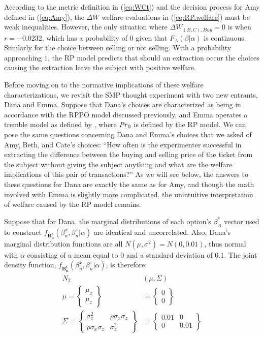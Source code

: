 According to the metric definition in (\ref{eq:WCt}) and the decision process for Amy defined in (\ref{eq:Amy}), the $\Delta W$ welfare evaluations in (\ref{eq:RP.welfare}) must be weak inequalities.
However, the only situation where $\Delta W_{(B,C),\mathit{Buy}} = 0$ is when $r=-0.0232$, which has a probability of $0$ given that $F_A(\beta|\alpha)$ is continuous.
Similarly for the choice between selling or not selling.
With a probability approaching $1$, the RP model predicts that should an extraction occur the choices causing the extraction leave the subject with positive welfare.

Before moving on to the normative implications of these welfare characterizations, we revisit the SMP thought experiment with two new entrants, Dana and Emma.
Suppose that Dana's choices are characterized as being in accordance with the RPPO model discussed previously, and Emma operates a tremble model as defined by \textcite{Loomes2002}, where $ {\mathit{Pr}}_0$ is defined by the RP model.
We can pose the same questions concerning Dana and Emma's choices that we asked of Amy, Beth, and Cate's choices: \enquote{How often is the experimenter successful in extracting the difference between the buying and selling price of the ticket from the subject without giving the subject anything and what are the welfare implications of this pair of transactions?} 
As we will see below, the answers to these questions for Dana are exactly the same as for Amy, and though the math involved with Emma is slightly more complicated, the unintuitive interpretation of welfare caused by the RP model remains.

Suppose that for Dana, the marginal distributions of each option's $\beta_A^*$ vector used to construct $f_{\mathbf{B_n^t}}(\beta_n^ x,\beta_n^ z|\alpha)$ are identical and uncorrelated.{\footnotemark}
Also, Dana's marginal distribution functions are all $N(\mu,\sigma^2) = N(0,0.01)$, thus normal with $\alpha$ consisting of a mean equal to $0$ and a standard deviation of $0.1$.
The joint density function, $f_{\mathbf{B_n^t}}(\beta_n^x,\beta_n^z|\alpha)$, is therefore:
\begin{align}
	\begin{split}
		N_2&(\mu,\Sigma) \\
		\mu =\begin{Bmatrix}\mu_x \\ \mu_z\end{Bmatrix} &= \begin{Bmatrix}0\\0\end{Bmatrix}\\
		\Sigma =\begin{Bmatrix} \sigma_x^2 & \rho\sigma_x\sigma_z \\  \rho\sigma_x\sigma_z & \sigma_z^2 \end{Bmatrix} &= 
	\begin{Bmatrix} 0.01 & 0 \\  0 & 0.01 \end{Bmatrix} 
	\end{split}
\end{align}


